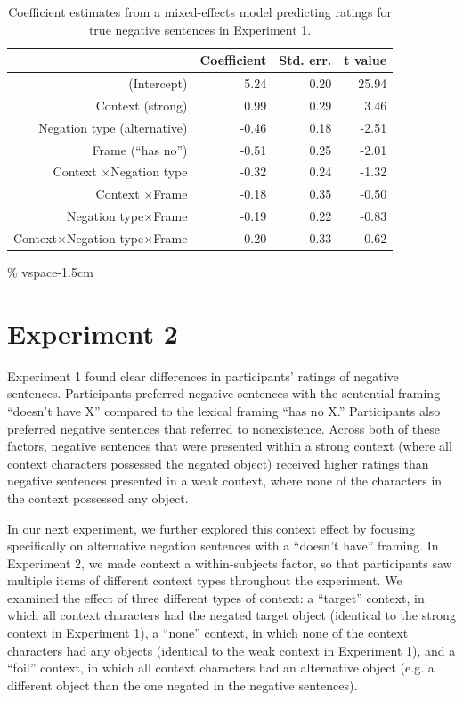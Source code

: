 \documentclass[10pt,letterpaper]{article}
\begin{document}
\begin{table}[t]
\caption{\label{tab:s1} Coefficient estimates from a mixed-effects model predicting ratings for true negative sentences in Experiment 1.}
\begin{center}
\small\addtolength{\tabcolsep}{-5pt}
\begin{tabular}{rrrr}
  \hline
 & Coefficient & Std. err. & t value \\ 
  \hline
(Intercept) & 5.24 & 0.20 & 25.94 \\ 
  Context (strong) & 0.99 & 0.29 & 3.46  \\ 
  Negation type (alternative) & -0.46 & 0.18 & -2.51 \\
  Frame (``has no'') & -0.51 & 0.25 & -2.01 \\ 
  Context $\times$Negation type & -0.32 & 0.24 & -1.32 \\
  Context $\times$Frame & -0.18 & 0.35 & -0.50 \\
  Negation type$\times$Frame & -0.19 & 0.22 & -0.83 \\
  Context$\times$Negation type$\times$Frame & 0.20 & 0.33 & 0.62 \\
   \hline
\end{tabular}
\% vspace{-1.5cm}
\end{center}
\end{table}

\section{Experiment 2}

Experiment 1 found clear differences in participants' ratings of negative sentences.  Participants preferred negative sentences with the sentential framing ``doesn't have X'' compared to the lexical framing ``has no X.''  Participants also preferred negative sentences that referred to nonexistence.  Across both of these factors, negative sentences that were presented within a strong context (where all context characters possessed the negated object) received higher ratings than negative sentences presented in a weak context, where none of the characters in the context possessed any object.

In our next experiment, we further explored this context effect by focusing specifically on alternative negation sentences with a ``doesn't have'' framing.  In Experiment 2, we made context a within-subjects factor, so that participants saw multiple items of different context types throughout the experiment.  We examined the effect of three different types of context: a ``target'' context, in which all context characters had the negated target object (identical to the strong context in Experiment 1), a ``none'' context, in which none of the context characters had any objects (identical to the weak context in Experiment 1), and a ``foil'' context, in which all context characters had an alternative object (e.g. a different object than the one negated in the negative sentences). 
\end{document}
